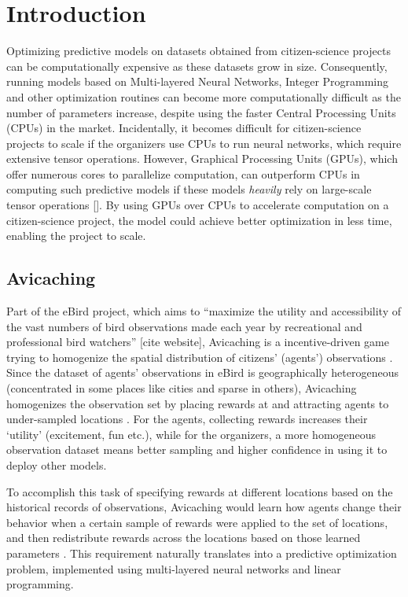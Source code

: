 \section{Introduction} \label{sec:Introduction}
Optimizing predictive models on datasets obtained from citizen-science projects can be computationally expensive as these datasets grow in size. Consequently, running models based on Multi-layered Neural Networks, Integer Programming and other optimization routines can become more computationally difficult as the number of parameters increase, despite using the faster Central Processing Units (CPUs) in the market. Incidentally, it becomes difficult for citizen-science projects to scale if the organizers use CPUs to run neural networks, which require extensive tensor operations. However, Graphical Processing Units (GPUs), which offer numerous cores to parallelize computation, can outperform CPUs in computing such predictive models if these models \textit{heavily} rely on large-scale tensor operations []. By using GPUs over CPUs to accelerate computation on a citizen-science project, the model could achieve better optimization in less time, enabling the project to scale.

\subsection{Avicaching} \label{sec:Avicaching}
Part of the eBird project, which aims to ``maximize the utility and accessibility of the vast numbers of bird observations made each year by recreational and professional bird watchers'' [cite website], Avicaching is a incentive-driven game trying to homogenize the spatial distribution of citizens' (agents') observations \cite{Xue2016Avi1}. Since the dataset of agents' observations in eBird is geographically heterogeneous (concentrated in some places like cities and sparse in others), Avicaching homogenizes the observation set by placing rewards at and attracting agents to under-sampled locations \cite{Xue2016Avi1}. For the agents, collecting rewards increases their `utility' (excitement, fun etc.), while for the organizers, a more homogeneous observation dataset means better sampling and higher confidence in using it to deploy other models. 

To accomplish this task of specifying rewards at different locations based on the historical records of observations, Avicaching would learn how agents change their behavior when a certain sample of rewards were applied to the set of locations, and then redistribute rewards across the locations based on those learned parameters \cite{Xue2016Avi2}. This requirement naturally translates into a predictive optimization problem, implemented using multi-layered neural networks and linear programming.

